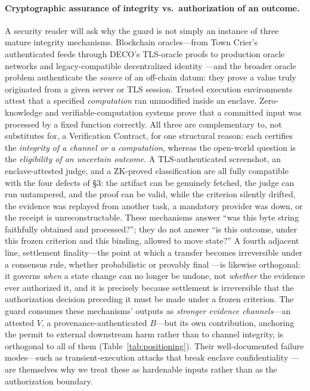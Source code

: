 \documentclass[sigconf,anonymous,review]{acmart}
\begin{document}
\paragraph{Cryptographic assurance of integrity vs.\ authorization of an outcome.} A security reader will ask why the guard is not simply an instance of three mature integrity mechanisms. Blockchain oracles---from Town Crier's authenticated feeds \cite{zhang2016towncrier} through DECO's TLS-oracle proofs \cite{zhang2020deco} to production oracle networks \cite{ellis2017chainlink} and legacy-compatible decentralized identity \cite{maram2021candid}---and the broader oracle problem \cite{caldarelli2020oracle} authenticate the \emph{source} of an off-chain datum: they prove a value truly originated from a given server or TLS session. Trusted execution environments \cite{costan2016sgx,intel2021tdx,sabt2015tee} attest that a specified \emph{computation} ran unmodified inside an enclave. Zero-knowledge and verifiable-computation systems \cite{goldwasser1989knowledge,parno2013pinocchio,ben2014succinct,thaler2022proofs} prove that a committed input was processed by a fixed function correctly. All three are complementary to, not substitutes for, a Verification Contract, for one structural reason: each certifies the \emph{integrity of a channel or a computation}, whereas the open-world question is the \emph{eligibility of an uncertain outcome}. A TLS-authenticated screenshot, an enclave-attested judge, and a ZK-proved classification are all fully compatible with the four defects of \S3: the artifact can be genuinely fetched, the judge can run untampered, and the proof can be valid, while the criterion silently drifted, the evidence was replayed from another task, a mandatory provider was down, or the receipt is unreconstructable. These mechanisms answer ``was this byte string faithfully obtained and processed?''; they do not answer ``is this outcome, under this frozen criterion and this binding, allowed to move state?'' A fourth adjacent line, settlement finality---the point at which a transfer becomes irreversible under a consensus rule, whether probabilistic \cite{nakamoto2008bitcoin,garay2015backbone} or provably final \cite{buterin2020gasper,buchman2016tendermint}---is likewise orthogonal: it governs \emph{when} a state change can no longer be undone, not \emph{whether} the evidence ever authorized it, and it is precisely because settlement is irreversible that the authorization decision preceding it must be made under a frozen criterion. The guard consumes these mechanisms' outputs as \emph{stronger evidence channels}---an attested $V$, a provenance-authenticated $B$---but its own contribution, anchoring the permit to external downstream harm rather than to channel integrity, is orthogonal to all of them (Table~\ref{tab:positioning}). Their well-documented failure modes---such as transient-execution attacks that break enclave confidentiality \cite{vanbulck2018foreshadow}---are themselves why we treat these as hardenable inputs rather than as the authorization boundary.
\end{document}
